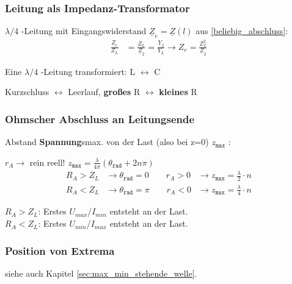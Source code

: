 \subsubsection{Leitung als Impedanz-Transformator}
$\lambda / 4$ -Leitung mit Eingangswiderstand $ \underline{Z}_e =
	\underline{Z}(l) $ aus  \ref{beliebig_abschluss}:
\begin{align*}
	\frac{\underline{Z}_e}{Z_L} & = \frac{Z_L}{\underline{Z}_2} = \frac{\underline{Y}_2}{Y_L} \rightarrow Z_e = \frac{Z^2_L}{\underline{Z}_2}
\end{align*}

Eine $ \lambda / 4 $ -Leitung transformiert: L $ \leftrightarrow $ C

Kurzschluss $ \leftrightarrow $ Leerlauf, \textbf{großes} R $ \leftrightarrow$
\textbf{kleines} R

\subsubsection{Ohmscher Abschluss an Leitungsende}
Abstand \textbf{Spannung}smax. von der Last (also bei z=0) $ z_{\texttt{max}} $ :

$ r_A \rightarrow$ rein reell! \qquad $ z_{\texttt{max}} = \frac{\lambda}{4\pi}
	(\theta_{\texttt{rad}}+2n\pi)$
\begin{align*}
	R_A > Z_L & \rightarrow\theta_{\texttt{rad}} = 0 \qquad r_A >0
	          & \rightarrow z_\texttt{max}=\frac{\lambda}{2}\cdot n  \\
	R_A < Z_L & \rightarrow\theta_{\texttt{rad}} = \pi \qquad r_A <0
	          & \rightarrow z_\texttt{max}=\frac{\lambda}{4}\cdot n
\end{align*}

$ R_A > Z_L $: Erstes $ U_{max}$/$ I_{min} $ entsteht an der Last.\\
$ R_A < Z_L $: Erstes $ U_{min}$/$ I_{max} $ entsteht an der Last.

\subsubsection{Position von Extrema}
siehe auch Kapitel \ref{sec:max_min_stehende_welle}.

